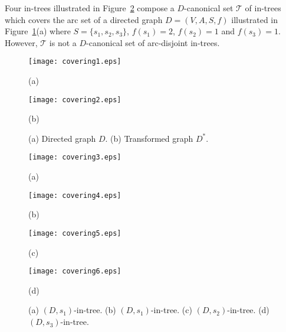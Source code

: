 \documentclass[11pt]{article}
\newcounter{ni}
\theoremstyle{plain}
\begin{document}
Four in-trees illustrated in Figure~\ref{fig:covering2}
compose a $D$-canonical set $\mathcal{T}$ of in-trees which covers the arc set of a
directed graph  $D=(V,A,S,f)$ illustrated in Figure~\ref{fig:covering1}(a) where 
$S=\{s_1,s_2,s_3\}$, $f(s_1)=2$, $f(s_2)=1$ and $f(s_3)=1$. However, $\mathcal{T}$ 
is not a $D$-canonical set of arc-disjoint in-trees. 
\begin{figure}[h]
\begin{minipage}{0.5\hsize}
\begin{center}
\texttt{[image: covering1.eps]}
\par(a)
\end{center}
\end{minipage}
\begin{minipage}{0.5\hsize}
\begin{center}
\texttt{[image: covering2.eps]}
\par(b)
\end{center}
\end{minipage}
\caption{\small (a) Directed graph  $D$. (b) Transformed graph $D^{\ast}$.}
\label{fig:covering1}
\end{figure}
\begin{figure}[h]
\begin{minipage}{0.245\hsize}
\begin{center}
\texttt{[image: covering3.eps]}
\par(a)
\end{center}
\end{minipage}
\begin{minipage}{0.245\hsize}
\begin{center}
\texttt{[image: covering4.eps]}
\par(b)
\end{center}
\end{minipage}
\begin{minipage}{0.245\hsize}
\begin{center}
\texttt{[image: covering5.eps]}
\par(c)
\end{center}
\end{minipage}
\begin{minipage}{0.245\hsize}
\begin{center}
\texttt{[image: covering6.eps]}
\par(d)
\end{center}
\end{minipage}
\caption{\small (a) $(D,s_1)$-in-tree. (b) $(D,s_1)$-in-tree. (c) $(D,s_2)$-in-tree. (d) $(D,s_3)$-in-tree.}
\label{fig:covering2}
\end{figure}
\end{document}
